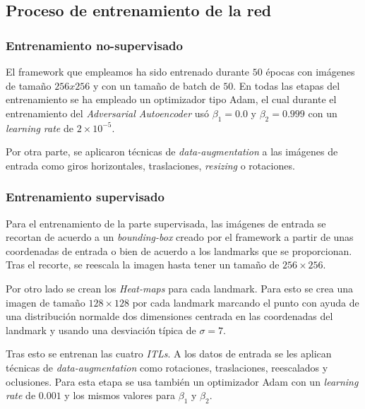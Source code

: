         \subsection{Proceso de entrenamiento de la red}

            \subsubsection{Entrenamiento no-supervisado}
                \noindent El framework que empleamos ha sido entrenado durante $50$ épocas con imágenes de tamaño $256x256$ y con un tamaño de batch de $50$. En todas las etapas del entrenamiento se ha empleado un optimizador tipo Adam, el cual durante el entrenamiento del \textit{Adversarial Autoencoder} usó $\beta_1=0.0$ y $\beta_2=0.999$ con un \textit{learning rate} de $2\times 10^{-5}$.

                \medskip

                \noindent Por otra parte, se aplicaron técnicas de \textit{data-augmentation} a las imágenes de entrada como giros horizontales, traslaciones, \textit{resizing} o rotaciones.

            \subsubsection{Entrenamiento supervisado}
                \noindent Para el entrenamiento de la parte supervisada, las imágenes de entrada se recortan de acuerdo a un \textit{bounding-box} creado por el framework a partir de unas coordenadas de entrada o bien de acuerdo a los landmarks que se proporcionan. Tras el recorte, se reescala la imagen hasta tener un tamaño de $256\times256$. 
                
                \medskip

                \noindent Por otro lado se crean los \textit{Heat-maps} para cada landmark. Para esto se crea una imagen de tamaño $128 \times 128$ por cada landmark marcando el punto con ayuda de una distribución normalde dos dimensiones centrada en las coordenadas del landmark y usando una desviación típica de $\sigma=7$.

                \medskip

                \noindent Tras esto se entrenan las cuatro \textit{ITLs}. A los datos de entrada se les aplican técnicas de \textit{data-augmentation} como rotaciones, traslaciones, reescalados y oclusiones. Para esta etapa se usa también un optimizador Adam con un \textit{learning rate} de $0.001$ y los mismos valores para $\beta_1$ y $\beta_2$.

